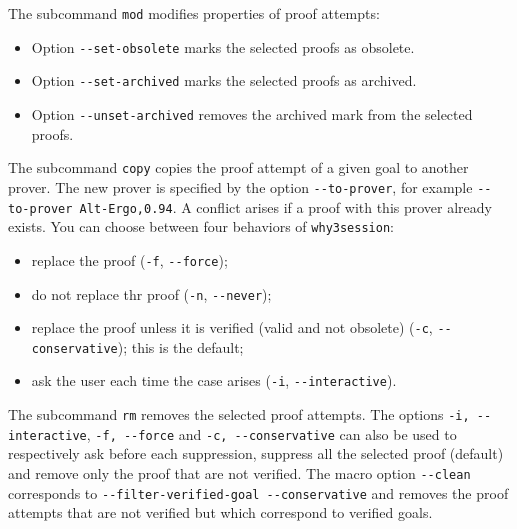 \noindent
The subcommand \texttt{mod} modifies properties of proof
attempts:
\begin{itemize}
\item Option \verb|--set-obsolete| marks the selected proofs as
  obsolete.
\item Option \verb|--set-archived| marks the selected proofs as archived.
\item Option \verb|--unset-archived| removes the archived mark from the selected proofs.
\end{itemize}

The subcommand \texttt{copy} copies the proof attempt of a given goal to another
prover. The new prover is specified by the option
\verb|--to-prover|, for example \texttt{-{}-to-prover Alt-Ergo,0.94}.
A conflict arises if a proof with this prover already exists.
You can choose between four behaviors of \texttt{why3session}:
\begin{itemize}
\item replace the proof (\verb|-f|, \verb|--force|);
\item do not replace thr proof (\verb|-n|, \verb|--never|);
\item replace the proof unless it is verified (valid and not
  obsolete) (\verb|-c|, \verb|--conservative|); this is the default;
\item ask the user each time the case arises (\verb|-i|, \verb|--interactive|).
\end{itemize}


The subcommand \texttt{rm} removes the selected proof
attempts. The options \verb|-i, --interactive|, \verb|-f, --force| and
\verb|-c, --conservative| can also be used to respectively ask before
each suppression, suppress all the selected proof (default) and remove
only the proof that are not verified. The macro option \verb|--clean|
corresponds to \verb|--filter-verified-goal --conservative| and
removes the proof attempts that are not verified but which correspond
to verified goals.





